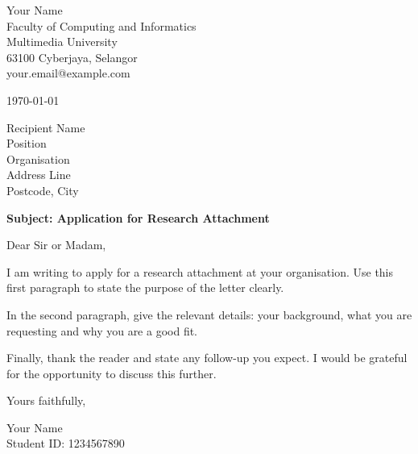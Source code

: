 \documentclass[11pt,a4paper]{article}
\begin{document}
\begin{flushright}
Your Name\\
Faculty of Computing and Informatics\\
Multimedia University\\
63100 Cyberjaya, Selangor\\
your.email@example.com
\end{flushright}

\today

Recipient Name\\
Position\\
Organisation\\
Address Line\\
Postcode, City

\textbf{Subject: Application for Research Attachment}

Dear Sir or Madam,

I am writing to apply for a research attachment at your organisation. Use this first paragraph to state the purpose of the letter clearly.

In the second paragraph, give the relevant details: your background, what you are requesting and why you are a good fit.

Finally, thank the reader and state any follow-up you expect. I would be grateful for the opportunity to discuss this further.

Yours faithfully,

\vspace{1.5cm}

Your Name\\
Student ID: 1234567890
\end{document}
